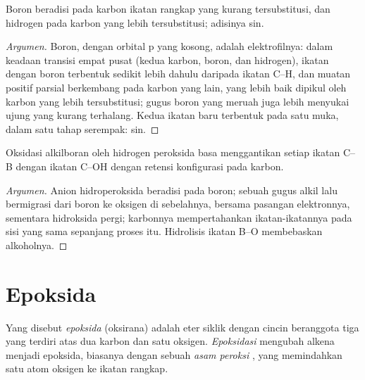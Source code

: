 \begin{proposition}\label{prop:b2:alkene-redox:hydroboration-regio}
Boron beradisi pada karbon ikatan rangkap yang kurang tersubstitusi, dan
hidrogen pada karbon yang lebih tersubstitusi; adisinya sin.
\end{proposition}

\begin{proof}[Argumen]
Boron, dengan orbital p yang kosong, adalah elektrofilnya: dalam keadaan
transisi empat pusat (kedua karbon, boron, dan hidrogen), ikatan dengan
boron terbentuk sedikit lebih dahulu daripada ikatan C--H, dan muatan
positif parsial berkembang pada karbon yang lain, yang lebih baik dipikul
oleh karbon yang lebih tersubstitusi; gugus boron yang meruah juga lebih
menyukai ujung yang kurang terhalang. Kedua ikatan baru terbentuk pada satu
muka, dalam satu tahap serempak: sin.
\end{proof}

\begin{proposition}\label{prop:b2:alkene-redox:retention}
Oksidasi alkilboran oleh hidrogen peroksida basa menggantikan setiap ikatan
C--B dengan ikatan C--OH dengan retensi konfigurasi pada karbon.
\end{proposition}

\begin{proof}[Argumen]
Anion hidroperoksida beradisi pada boron; sebuah gugus alkil lalu bermigrasi
dari boron ke oksigen di sebelahnya, bersama pasangan elektronnya, sementara
hidroksida pergi; karbonnya mempertahankan ikatan-ikatannya pada sisi yang
sama sepanjang proses itu. Hidrolisis ikatan B--O membebaskan alkoholnya.
\end{proof}

\section{Epoksida}

\begin{definition}[Epoksida]\label{def:b2:alkene-redox:epoxide}
Yang disebut \emph{epoksida} (oksirana) adalah eter siklik
dengan cincin beranggota tiga yang terdiri atas dua karbon dan satu oksigen.
\emph{Epoksidasi} mengubah alkena menjadi epoksida,
biasanya dengan sebuah \emph{asam peroksi} , yang
memindahkan satu atom oksigen ke ikatan rangkap.
\end{definition}

